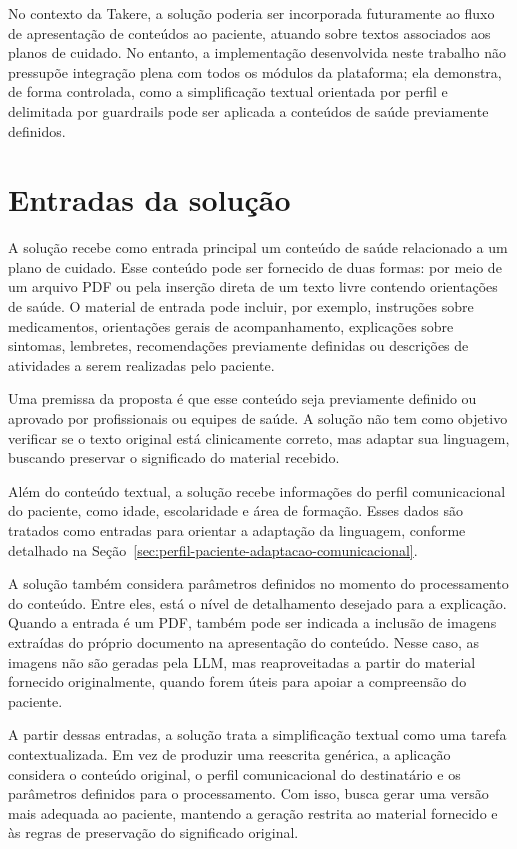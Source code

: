 No contexto da Takere, a solução poderia ser incorporada futuramente ao fluxo de apresentação de conteúdos ao paciente, atuando sobre textos associados aos planos de cuidado. No entanto, a implementação desenvolvida neste trabalho não pressupõe integração plena com todos os módulos da plataforma; ela demonstra, de forma controlada, como a simplificação textual orientada por perfil e delimitada por guardrails pode ser aplicada a conteúdos de saúde previamente definidos.

\section{Entradas da solução} 
\label{sec:entradas-solucao} A solução recebe como entrada principal um conteúdo de saúde relacionado a um plano de cuidado. Esse conteúdo pode ser fornecido de duas formas: por meio de um arquivo PDF ou pela inserção direta de um texto livre contendo orientações de saúde. O material de entrada pode incluir, por exemplo, instruções sobre medicamentos, orientações gerais de acompanhamento, explicações sobre sintomas, lembretes, recomendações previamente definidas ou descrições de atividades a serem realizadas pelo paciente. 

Uma premissa da proposta é que esse conteúdo seja previamente definido ou aprovado por profissionais ou equipes de saúde. A solução não tem como objetivo verificar se o texto original está clinicamente correto, mas adaptar sua linguagem, buscando preservar o significado do material recebido. 

Além do conteúdo textual, a solução recebe informações do perfil comunicacional do paciente, como idade, escolaridade e área de formação. Esses dados são tratados como entradas para orientar a adaptação da linguagem, conforme detalhado na Seção~\ref{sec:perfil-paciente-adaptacao-comunicacional}.

A solução também considera parâmetros definidos no momento do processamento do conteúdo. Entre eles, está o nível de detalhamento desejado para a explicação. Quando a entrada é um PDF, também pode ser indicada a inclusão de imagens extraídas do próprio documento na apresentação do conteúdo. Nesse caso, as imagens não são geradas pela LLM, mas reaproveitadas a partir do material fornecido originalmente, quando forem úteis para apoiar a compreensão do paciente.

A partir dessas entradas, a solução trata a simplificação textual como uma tarefa contextualizada. Em vez de produzir uma reescrita genérica, a aplicação considera o conteúdo original, o perfil comunicacional do destinatário e os parâmetros definidos para o processamento. Com isso, busca gerar uma versão mais adequada ao paciente, mantendo a geração restrita ao material fornecido e às regras de preservação do significado original. 

